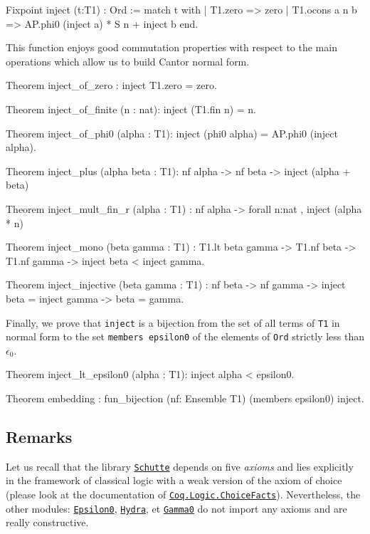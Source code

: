 {\begin{Coqsrc}
Fixpoint inject (t:T1) : Ord :=
 match t with 
     | T1.zero => zero
     | T1.ocons a n b =>  AP.phi0 (inject a) * S n + inject b
 end.  
\end{Coqsrc}

This function enjoys good commutation properties with respect to the main operations which
allow us to build Cantor normal form.

\begin{Coqsrc}
Theorem inject_of_zero : inject T1.zero = zero.

Theorem inject_of_finite (n : nat):
  inject (T1.fin n) =  n.

Theorem inject_of_phi0 (alpha : T1):
  inject (phi0 alpha) = AP.phi0 (inject alpha).

Theorem inject_plus (alpha beta : T1): nf alpha -> nf beta ->
  inject (alpha + beta)%

Theorem inject_mult_fin_r (alpha : T1)  :
  nf alpha -> forall n:nat , inject (alpha *  n)%

Theorem inject_mono (beta gamma : T1) :
  T1.lt  beta gamma -> 
  T1.nf beta -> T1.nf gamma -> 
  inject beta < inject gamma.

Theorem inject_injective (beta gamma : T1) : nf beta -> nf gamma ->
  inject beta = inject gamma -> beta = gamma.
\end{Coqsrc}

Finally, we prove that \texttt{inject} is a bijection from the set of all terms of \texttt{T1} in normal form to the set 
\texttt{members epsilon0} of the elements of \texttt{Ord} strictly less than  $\epsilon_0$.

\begin{Coqsrc}
Theorem inject_lt_epsilon0 (alpha : T1):
      inject alpha < epsilon0.

Theorem embedding : 
     fun_bijection (nf: Ensemble T1)  (members epsilon0) inject.
 \end{Coqsrc}

\subsection{Remarks}
Let us recall that the library \href{../theories/html/hydras.Schutte.Schutte.html}%
{\texttt{Schutte}} depends on five \emph{axioms} and lies explicitly in the  
framework of classical logic with a weak version of the axiom of choice
(please look at the documentation of
\href{https://coq.inria.fr/distrib/current/stdlib/Coq.Logic.ChoiceFacts.html}{\texttt{Coq.Logic.ChoiceFacts}}).
Nevertheless, the other modules:
\href{../theories/html/hydras.Epsilon0.Epsilon0.html}%
{\texttt{Epsilon0}},
\href{../theories/html/hydras.Hydra.Hydra.html}%
{\texttt{Hydra}}, et 
\href{../theories/html/hydras.Gamma0.Gamma0.html}%
{\texttt{Gamma0}}
do not import any axioms and are really constructive.

}
